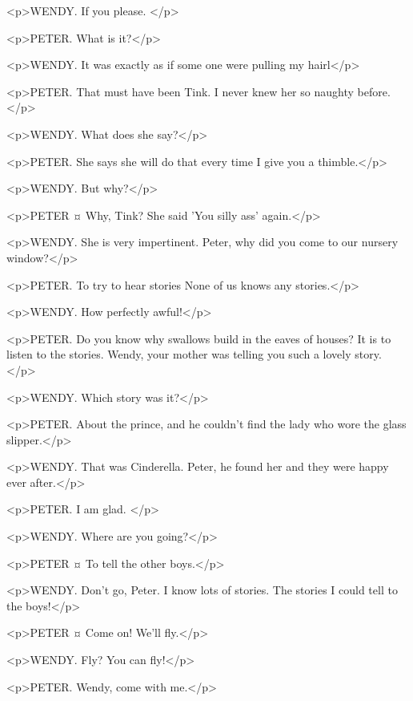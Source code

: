 <p>WENDY. If you please.
</p>

<p>PETER. What is it?</p>

<p>WENDY. It was exactly as if some one were pulling my hairl</p>

<p>PETER. That must have been Tink. I never knew her so naughty before.</p>


<p>WENDY. What does she say?</p>

<p>PETER. She says she will do that every time I give you a thimble.</p>

<p>WENDY. But why?</p>

<p>PETER ¤
Why, Tink?
She said 'You silly ass' again.</p>

<p>WENDY. She is very impertinent.
Peter, why did you come to our nursery window?</p>

<p>PETER. To try to hear stories None of us knows any stories.</p>

<p>WENDY. How perfectly awful!</p>

<p>PETER. Do you know why swallows build in the eaves of houses? It is to listen to the stories. Wendy, your mother was telling you such a lovely story.</p>

<p>WENDY. Which story was it?</p>

<p>PETER. About the prince, and he couldn't find the lady who wore the glass slipper.</p>

<p>WENDY. That was Cinderella. Peter, he found her and they were happy ever after.</p>

<p>PETER. I am glad.
</p>

<p>WENDY. Where are you going?</p>

<p>PETER ¤
To tell the other boys.</p>

<p>WENDY. Don't go, Peter. I know lots of stories. The stories I could tell to the boys!</p>

<p>PETER ¤
Come on! We'll fly.</p>

<p>WENDY. Fly? You can fly!</p>


<p>PETER. Wendy, come with me.</p>

